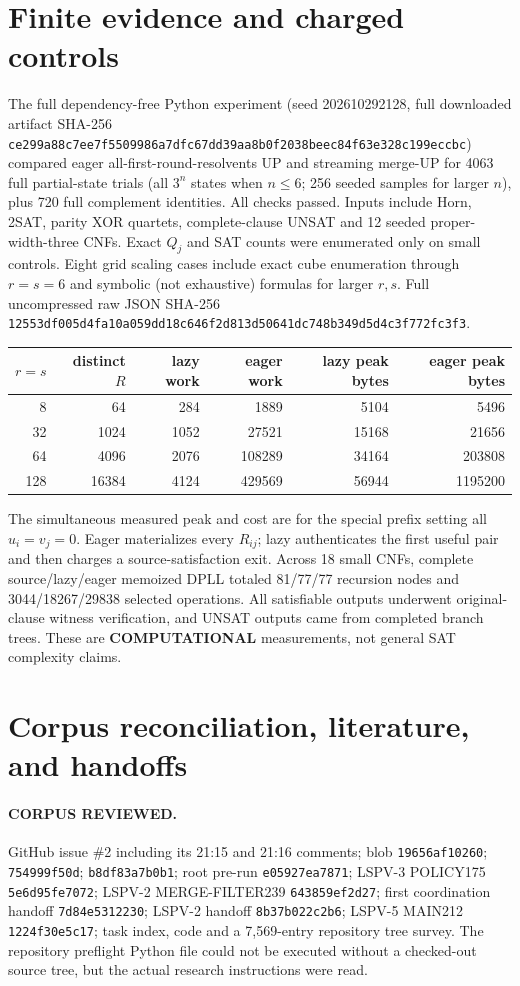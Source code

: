 \documentclass[11pt]{article}
\begin{document}
\section{Finite evidence and charged controls}
The full dependency-free Python experiment (seed 202610292128, full downloaded artifact SHA-256 \texttt{ce299a88c7ee7f5509986a7dfc67dd39aa8b0f2038beec84f63e328c199eccbc}) compared eager all-first-round-resolvents UP and streaming merge-UP for 4063 full partial-state trials (all $3^n$ states when $n\le6$; 256 seeded samples for larger $n$), plus 720 full complement identities. All checks passed. Inputs include Horn, 2SAT, parity XOR quartets, complete-clause UNSAT and 12 seeded proper-width-three CNFs. Exact $Q_j$ and SAT counts were enumerated only on small controls. Eight grid scaling cases include exact cube enumeration through $r=s=6$ and symbolic (not exhaustive) formulas for larger $r,s$. Full uncompressed raw JSON SHA-256 \texttt{12553df005d4fa10a059dd18c646f2d813d50641dc748b349d5d4c3f772fc3f3}.
\begin{center}\begin{tabular}{r r r r r r}\toprule
$r=s$ & distinct $R$ & lazy work & eager work & lazy peak bytes & eager peak bytes\\\midrule
8 &64&284&1889&5104&5496\\
32&1024&1052&27521&15168&21656\\
64&4096&2076&108289&34164&203808\\
128&16384&4124&429569&56944&1195200\\\bottomrule
\end{tabular}\end{center}
The simultaneous measured peak and cost are for the special prefix setting all $u_i=v_j=0$. Eager materializes every $R_{ij}$; lazy authenticates the first useful pair and then charges a source-satisfaction exit. Across 18 small CNFs, complete source/lazy/eager memoized DPLL totaled 81/77/77 recursion nodes and 3044/18267/29838 selected operations. All satisfiable outputs underwent original-clause witness verification, and UNSAT outputs came from completed branch trees. These are \textbf{COMPUTATIONAL} measurements, not general SAT complexity claims.

\section{Corpus reconciliation, literature, and handoffs}
\paragraph{CORPUS REVIEWED.} GitHub issue \#2 including its 21:15 and 21:16 comments;  blob \texttt{19656af10260};  \texttt{754999f50d};  \texttt{b8df83a7b0b1}; root  pre-run \texttt{e05927ea7871}; LSPV-3 POLICY175 \texttt{5e6d95fe7072}; LSPV-2 MERGE-FILTER239 \texttt{643859ef2d27}; first coordination handoff \texttt{7d84e5312230}; LSPV-2 handoff \texttt{8b37b022c2b6}; LSPV-5 MAIN212 \texttt{1224f30e5c17}; task index, code and a 7,569-entry repository tree survey. The repository preflight Python file could not be executed without a checked-out source tree, but the actual research instructions were read.
\end{document}
